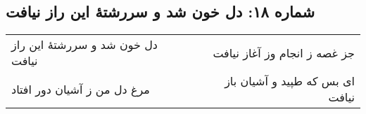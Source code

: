 \begin{center}
\section*{شماره ۱۸: دل خون شد و سررشتۀ این راز نیافت}
\label{sec:018}
\begin{longtable}{l p{0.5cm} r}
دل خون شد و سررشتهٔ این راز نیافت
&&
جز غصه ز انجام وز آغاز نیافت
\\
مرغ دل من ز آشیان دور افتاد
&&
ای بس که طپید و آشیان باز نیافت
\\
\end{longtable}
\end{center}
